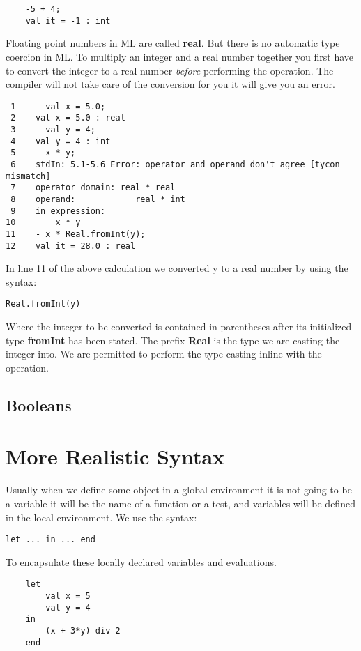 \begin{verbatim}
    -5 + 4;
    val it = -1 : int
\end{verbatim}

Floating point numbers in ML are called \textbf{real}. But there is no automatic type coercion in ML. To multiply an integer and a real number together you first have to convert the integer to a real number \emph{before} performing the operation. The compiler will not take care of the conversion for you it will give you an error. 

\begin{verbatim}
 1    - val x = 5.0;
 2    val x = 5.0 : real
 3    - val y = 4;
 4    val y = 4 : int
 5    - x * y; 
 6    stdIn: 5.1-5.6 Error: operator and operand don't agree [tycon mismatch]
 7    operator domain: real * real
 8    operand:            real * int
 9    in expression:
10        x * y
11    - x * Real.fromInt(y);
12    val it = 28.0 : real
\end{verbatim}

In line 11 of the above calculation we converted y to a real number by using the syntax: 
\begin{verbatim}
Real.fromInt(y)
\end{verbatim}
Where the integer to be converted is contained in parentheses after its initialized type \textbf{fromInt} has been stated. The prefix \textbf{Real} is the type we are casting the integer into. We are permitted to perform the type casting inline with the operation. 

\subsection{Booleans}


\section{More Realistic Syntax} 

Usually when we define some object in a global environment it is not going to be a variable it will be the name of a function or a test, and variables will be defined in the local environment. We use the syntax:
\begin{verbatim}
let ... in ... end
\end{verbatim}
To encapsulate these locally declared variables and evaluations. 

\begin{verbatim}
    let
        val x = 5
        val y = 4
    in
        (x + 3*y) div 2
    end
\end{verbatim}

